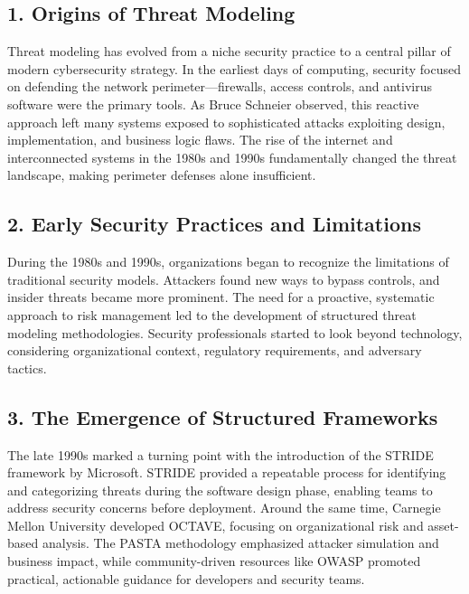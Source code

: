 
\subsection*{1. Origins of Threat Modeling}
Threat modeling has evolved from a niche security practice to a central pillar of modern cybersecurity strategy. In the earliest days of computing, security focused on defending the network perimeter—firewalls, access controls, and antivirus software were the primary tools. As Bruce Schneier observed\cite{schneier1999}, this reactive approach left many systems exposed to sophisticated attacks exploiting design, implementation, and business logic flaws. The rise of the internet and interconnected systems in the 1980s and 1990s fundamentally changed the threat landscape, making perimeter defenses alone insufficient.

\subsection*{2. Early Security Practices and Limitations}
During the 1980s and 1990s, organizations began to recognize the limitations of traditional security models. Attackers found new ways to bypass controls, and insider threats became more prominent. The need for a proactive, systematic approach to risk management led to the development of structured threat modeling methodologies. Security professionals started to look beyond technology, considering organizational context, regulatory requirements, and adversary tactics.

\subsection*{3. The Emergence of Structured Frameworks}
The late 1990s marked a turning point with the introduction of the STRIDE framework by Microsoft\cite{shostack2014}. STRIDE provided a repeatable process for identifying and categorizing threats during the software design phase, enabling teams to address security concerns before deployment. Around the same time, Carnegie Mellon University developed OCTAVE\cite{nist800154}, focusing on organizational risk and asset-based analysis. The PASTA methodology\cite{uceda2015} emphasized attacker simulation and business impact, while community-driven resources like OWASP\cite{owasp} promoted practical, actionable guidance for developers and security teams.


